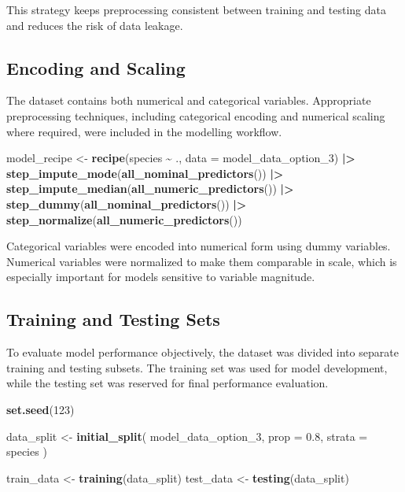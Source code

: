 \documentclass[
]{article}
\newenvironment{Shaded}{\begin{snugshade}}{\end{snugshade}}
\newcommand{\AttributeTok}[1]{\textcolor[rgb]{0.13,0.29,0.53}{#1}}
\newcommand{\DecValTok}[1]{\textcolor[rgb]{0.00,0.00,0.81}{#1}}
\newcommand{\FloatTok}[1]{\textcolor[rgb]{0.00,0.00,0.81}{#1}}
\newcommand{\FunctionTok}[1]{\textcolor[rgb]{0.13,0.29,0.53}{\textbf{#1}}}
\newcommand{\NormalTok}[1]{#1}
\newcommand{\OtherTok}[1]{\textcolor[rgb]{0.56,0.35,0.01}{#1}}
\newcommand{\SpecialCharTok}[1]{\textcolor[rgb]{0.81,0.36,0.00}{\textbf{#1}}}
\begin{document}
This strategy keeps preprocessing consistent between training and
testing data and reduces the risk of data leakage.

\subsection{Encoding and Scaling}\label{encoding-and-scaling}

The dataset contains both numerical and categorical variables.
Appropriate preprocessing techniques, including categorical encoding and
numerical scaling where required, were included in the modelling
workflow.

\begin{Shaded}
\begin{Highlighting}[]
\NormalTok{model\_recipe }\OtherTok{\textless{}{-}} \FunctionTok{recipe}\NormalTok{(species }\SpecialCharTok{\textasciitilde{}}\NormalTok{ ., }\AttributeTok{data =}\NormalTok{ model\_data\_option\_3) }\SpecialCharTok{|\textgreater{}}
  \FunctionTok{step\_impute\_mode}\NormalTok{(}\FunctionTok{all\_nominal\_predictors}\NormalTok{()) }\SpecialCharTok{|\textgreater{}}
  \FunctionTok{step\_impute\_median}\NormalTok{(}\FunctionTok{all\_numeric\_predictors}\NormalTok{()) }\SpecialCharTok{|\textgreater{}}
  \FunctionTok{step\_dummy}\NormalTok{(}\FunctionTok{all\_nominal\_predictors}\NormalTok{()) }\SpecialCharTok{|\textgreater{}}
  \FunctionTok{step\_normalize}\NormalTok{(}\FunctionTok{all\_numeric\_predictors}\NormalTok{())}
\end{Highlighting}
\end{Shaded}

Categorical variables were encoded into numerical form using dummy
variables. Numerical variables were normalized to make them comparable
in scale, which is especially important for models sensitive to variable
magnitude.

\subsection{Training and Testing Sets}\label{training-and-testing-sets}

To evaluate model performance objectively, the dataset was divided into
separate training and testing subsets. The training set was used for
model development, while the testing set was reserved for final
performance evaluation.

\begin{Shaded}
\begin{Highlighting}[]
\FunctionTok{set.seed}\NormalTok{(}\DecValTok{123}\NormalTok{)}

\NormalTok{data\_split }\OtherTok{\textless{}{-}} \FunctionTok{initial\_split}\NormalTok{(}
\NormalTok{  model\_data\_option\_3,}
  \AttributeTok{prop =} \FloatTok{0.8}\NormalTok{,}
  \AttributeTok{strata =}\NormalTok{ species}
\NormalTok{)}

\NormalTok{train\_data }\OtherTok{\textless{}{-}} \FunctionTok{training}\NormalTok{(data\_split)}
\NormalTok{test\_data  }\OtherTok{\textless{}{-}} \FunctionTok{testing}\NormalTok{(data\_split)}
\end{Highlighting}
\end{Shaded}
\end{document}
